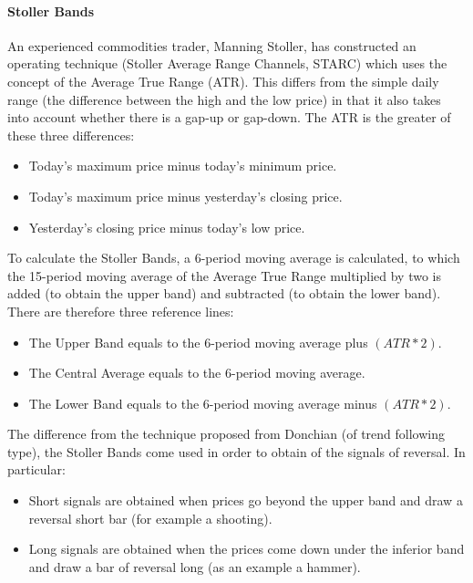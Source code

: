 \paragraph{\textbf{Stoller Bands}}\mbox{}

An experienced commodities trader, Manning Stoller, has constructed an operating technique (Stoller Average Range Channels, STARC) which uses the concept of the Average True Range (ATR). This differs from the simple daily range (the difference between the high and the low price) in that it also takes into account whether there is a gap-up or gap-down.
The ATR is the greater of these three differences:

\begin{itemize}
\setlength\itemsep{0.3em}
\item Today's maximum price minus today's minimum price.
\item Today's maximum price minus yesterday's closing price.
\item Yesterday's closing price minus today's low price.
\end{itemize}  


To calculate the Stoller Bands, a 6-period moving average is calculated, to which the 15-period moving average of the Average True Range multiplied by two is added (to obtain the upper band) and subtracted (to obtain the lower band).
There are therefore three reference lines:

\begin{itemize}
\setlength\itemsep{0.3em}
\item The Upper Band equals to the 6-period moving average plus $(ATR*2)$.
\item The Central Average equals to the 6-period moving average.
\item The Lower Band equals to the 6-period moving average minus $(ATR*2)$.
\end{itemize}  


The difference from the technique proposed from Donchian (of trend following type), the Stoller Bands come used in order to obtain of the signals of reversal. In particular:

\begin{itemize}
\setlength\itemsep{0.3em}
\item Short signals are obtained when prices go beyond the upper band and draw a reversal short bar (for example a shooting).
\item Long signals are obtained when the prices come down under the inferior band and draw a bar of reversal long (as an example a hammer).
\end{itemize} 


